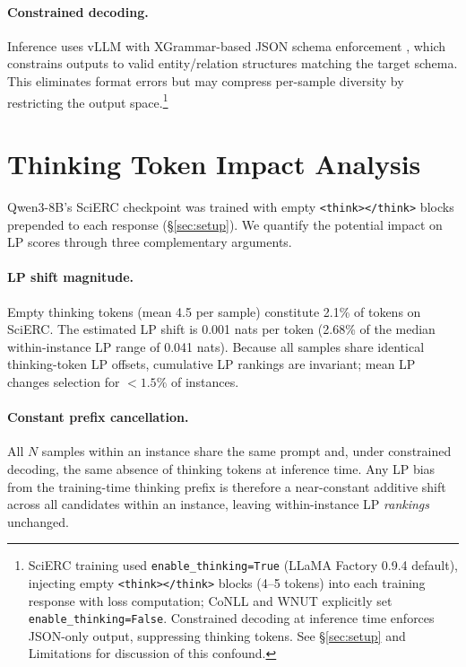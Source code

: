 \paragraph{Constrained decoding.}
Inference uses vLLM with XGrammar-based JSON schema enforcement \cite{dong2024xgrammar, willard2023guided}, which constrains outputs to valid entity/relation structures matching the target schema.
This eliminates format errors but may compress per-sample diversity by restricting the output space.\footnote{SciERC training used \texttt{enable\_thinking=True} (LLaMA Factory 0.9.4 default), injecting empty \texttt{<think></think>} blocks (4--5 tokens) into each training response with loss computation; CoNLL and WNUT explicitly set \texttt{enable\_thinking=False}. Constrained decoding at inference time enforces JSON-only output, suppressing thinking tokens. See \S\ref{sec:setup} and Limitations for discussion of this confound.}

\section{Thinking Token Impact Analysis}\label{app:thinking_token}

Qwen3-8B's SciERC checkpoint was trained with empty \texttt{<think></think>} blocks prepended to each response (\S\ref{sec:setup}).
We quantify the potential impact on LP scores through three complementary arguments.

\paragraph{LP shift magnitude.}
Empty thinking tokens (mean 4.5 per sample) constitute 2.1\% of tokens on SciERC.
The estimated LP shift is 0.001 nats per token (2.68\% of the median within-instance LP range of 0.041 nats).
Because all samples share identical thinking-token LP offsets, cumulative LP rankings are invariant; mean LP changes selection for ${<}1.5\%$ of instances.

\paragraph{Constant prefix cancellation.}
All $N$ samples within an instance share the same prompt and, under constrained decoding, the same absence of thinking tokens at inference time.
Any LP bias from the training-time thinking prefix is therefore a near-constant additive shift across all candidates within an instance, leaving within-instance LP \textit{rankings} unchanged.

